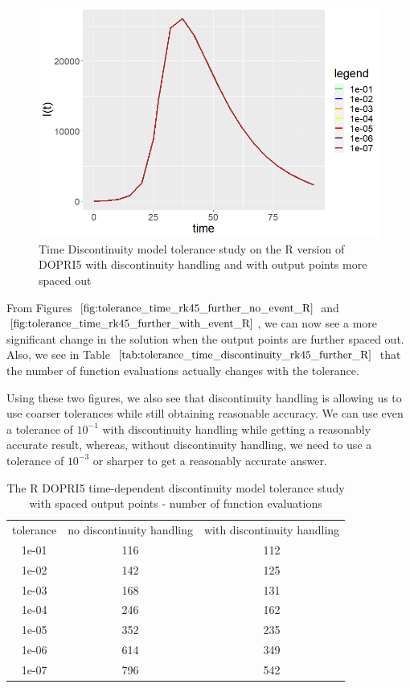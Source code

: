 \begin{figure}[H]
\centering
\includegraphics[width=0.7\linewidth]{./figures/tolerance_time_rk45_further_with_event_R}
\caption{Time Discontinuity model tolerance study on the R version of DOPRI5 with discontinuity handling and with output points more spaced out}
\label{fig:tolerance_time_rk45_further_with_event_R}
\end{figure}

From Figures $\ref{fig:tolerance_time_rk45_further_no_event_R}$ and $\ref{fig:tolerance_time_rk45_further_with_event_R}$, we can now see a more significant change in the solution when the output points are further spaced out. Also, we see in Table $\ref{tab:tolerance_time_discontinuity_rk45_further_R}$ that the number of function evaluations actually changes with the tolerance.

Using these two figures, we also see that discontinuity handling is allowing us to use coarser tolerances while still obtaining reasonable accuracy. We can use even a tolerance of $10^{-1}$ with discontinuity handling while getting a reasonably accurate result, whereas, without discontinuity handling, we need to use a tolerance of $10^{-3}$ or sharper to get a reasonably accurate answer.

\begin{table}[H]
\caption {The R DOPRI5 time-dependent discontinuity model tolerance study with spaced output points - number of function evaluations} \label{tab:tolerance_time_discontinuity_rk45_further_R} 
\begin{center}
\begin{tabular}{ c c c }
tolerance & no discontinuity handling & with discontinuity handling \\ 
1e-01 & 116 & 112 \\
1e-02 & 142 & 125 \\
1e-03 & 168 & 131 \\
1e-04 & 246 & 162 \\
1e-05 & 352 & 235 \\
1e-06 & 614 & 349 \\
1e-07 & 796 & 542 \\
\end{tabular}
\end{center}
\end{table}

